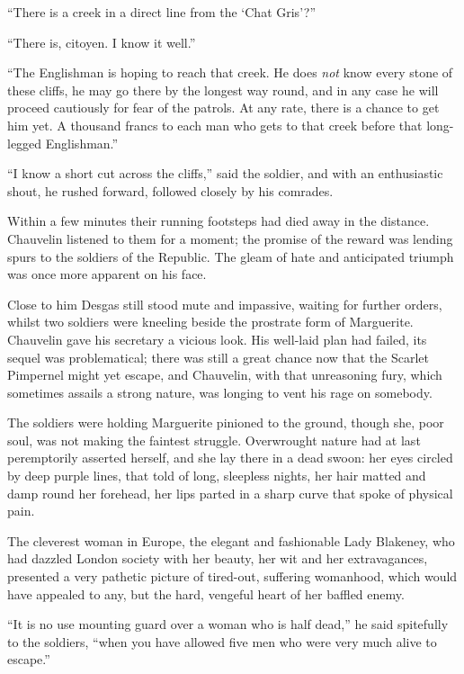 \documentclass[paper=a5,BCOR=7mm,twoside,DIV=calc,12pt,usegeometry,chapterprefix,endperiod,headings=big]{scrbook}
\begin{document}
\enquote{There is a creek in a direct line from the \enquote{Chat Gris}?}

\enquote{There is, citoyen. I know it well.}

\enquote{The Englishman is hoping to reach that creek. He does \textit{not} know every stone of these cliffs, he may go there by the longest way round, and in any case he will proceed cautiously for fear of the patrols. At any rate, there is a chance to get him yet. A thousand francs to each man who gets to that creek before that long-legged Englishman.}

\enquote{I know a short cut across the cliffs,} said the soldier, and with an enthusiastic shout, he rushed forward, followed closely by his comrades.

Within a few minutes their running footsteps had died away in the distance. Chauvelin listened to them for a moment; the promise of the reward was lending spurs to the soldiers of the Republic. The gleam of hate and anticipated triumph was once more apparent on his face.

Close to him Desgas still stood mute and impassive, waiting for further orders, whilst two soldiers were kneeling beside the prostrate form of Marguerite. Chauvelin gave his secretary a vicious look. His well-laid plan had failed, its sequel was problematical; there was still a great chance now that the Scarlet Pimpernel might yet escape, and Chauvelin, with that unreasoning fury, which sometimes assails a strong nature, was longing to vent his rage on somebody.

The soldiers were holding Marguerite pinioned to the ground, though she, poor soul, was not making the faintest struggle. Overwrought nature had at last peremptorily asserted herself, and she lay there in a dead swoon: her eyes circled by deep purple lines, that told of long, sleepless nights, her hair matted and damp round her forehead, her lips parted in a sharp curve that spoke of physical pain.

The cleverest woman in Europe, the elegant and fashionable Lady Blakeney, who had dazzled London society with her beauty, her wit and her extravagances, presented a very pathetic picture of tired-out, suffering womanhood, which would have appealed to any, but the hard, vengeful heart of her baffled enemy.

\enquote{It is no use mounting guard over a woman who is half dead,} he said spitefully to the soldiers, \enquote{when you have allowed five men who were very much alive to escape.}
\end{document}
